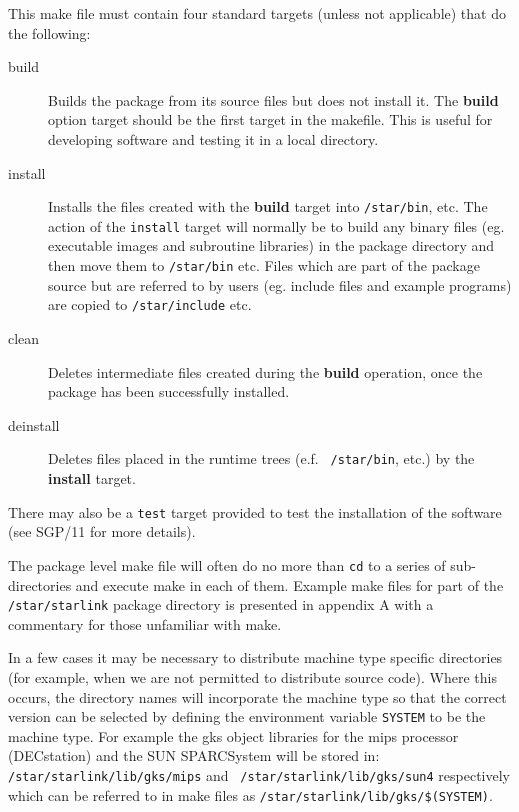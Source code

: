 This make file must contain four standard targets (unless not applicable)
that do the following:
\begin{description}

\item[build] Builds the package from its source files but does not install it.
The {\bf build} option target should be the first target in the makefile.
This is useful for developing software and testing it in a local directory.

\item[install] Installs the files created with the {\bf build} target
into {\tt /star/bin}, etc.
The action of the {\tt install} target will normally be to build any binary
files (eg. executable images and subroutine libraries) in the package directory
and then move them to {\tt /star/bin} etc. Files which are part of the package
source but are referred to by users (eg. include files and example programs) are
copied to {\tt /star/include} etc.

\item[clean] Deletes intermediate files created during the {\bf build}
operation, once the package has been successfully installed.

\item[deinstall] Deletes files placed in the runtime trees (e.f. {\tt
/star/bin}, etc.) by the {\bf install} target.


\end{description}


There may also be a {\tt test} target provided to test the installation of the
software (see SGP/11 for more details).


The package level make file will often do no more than {\tt cd} to a series
of sub-directories and execute make in each of them.
Example make files for part of the {\tt /star/starlink} package
directory is presented in appendix A with a commentary for those unfamiliar
with make.

In a few cases it may be necessary to distribute machine type specific
directories (for example, when we are not permitted to distribute source code).
Where this occurs, the directory names will incorporate the machine type so
that the correct version can be selected by defining the environment variable
{\tt SYSTEM} to be the machine type.
For example the gks object libraries for the
mips processor (DECstation) and the SUN SPARCSystem will be stored in:
{\tt /star\-/starlink\-/lib\-/gks\-/mips} and {\tt
/star\-/starlink\-/lib\-/gks\-/sun4} respectively which can be referred to
in make files as {\tt /star\-/starlink\-/lib\-/gks\-/\$(SYSTEM)}.

